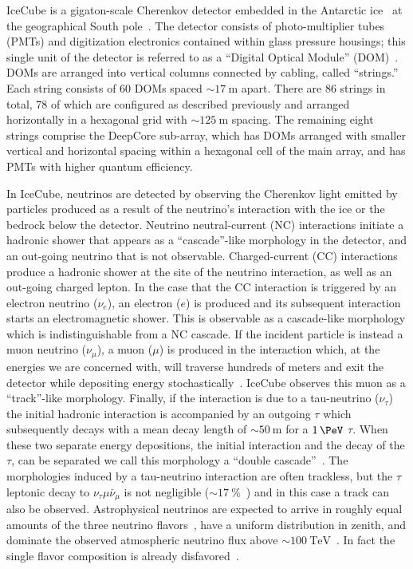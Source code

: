 IceCube is a gigaton-scale Cherenkov detector embedded in the Antarctic ice~\cite{Aartsen:2013rt} at the geographical South pole~\cite{Aartsen:2016nxy}.
The detector consists of photo-multiplier tubes (PMTs) and digitization electronics contained within glass pressure housings; this single unit of the detector is referred to as a ``Digital Optical Module'' (DOM)~\cite{Abbasi:2008aa}.
DOMs are arranged into vertical columns connected by cabling, called ``strings.''
Each string consists of 60 DOMs spaced $\sim\SI{17}\meter$ apart.
There are 86 strings in total, 78 of which are configured as described previously and arranged horizontally in a hexagonal grid with $\sim\SI{125}\meter$ spacing.
The remaining eight strings comprise the DeepCore sub-array, which has DOMs arranged with smaller vertical and horizontal spacing within a hexagonal cell of the main array, and has PMTs with higher quantum efficiency.%

In IceCube, neutrinos are detected by observing the Cherenkov light emitted by particles produced as a result of the neutrino's interaction with the ice or the bedrock below the detector.
Neutrino neutral-current (NC) interactions initiate a hadronic shower that appears as a ``cascade''-like morphology in the detector, and an out-going neutrino that is not observable.
Charged-current (CC) interactions produce a hadronic shower at the site of the neutrino interaction, as well as an out-going charged lepton.
In the case that the CC interaction is triggered by an electron neutrino ($\nu_e$), an electron ($e$) is produced and its subsequent interaction starts an electromagnetic shower.
This is observable as a cascade-like morphology which is indistinguishable from a NC cascade.
If the incident particle is instead a muon neutrino ($\nu_\mu$), a muon ($\mu$) is produced in the interaction which, at the energies we are concerned with, will traverse hundreds of meters and exit the detector while depositing energy stochastically~\cite{PhysRevD.98.030001}.
IceCube observes this muon as a ``track''-like morphology.
Finally, if the interaction is due to a tau-neutrino ($\nu_\tau$) the initial hadronic interaction is accompanied by an outgoing $\tau$ which subsequently decays with a mean decay length of $\sim \SI{50}\m$ for a $\SI{1}\PeV$ $\tau$.
When these two separate energy depositions, the initial interaction and the decay of the $\tau$, can be separated we call this morphology a ``double cascade''~\cite{Learned:1994wg,Cowen:2007ny}.
The morphologies induced by a tau-neutrino interaction are often trackless, but the $\tau$ leptonic decay to $\nu_\tau \mu \bar\nu_\mu$ is not negligible ($\sim \SI{17}\percent$~\cite{PDG2016}) and in this case a track can also be observed.
Astrophysical neutrinos are expected to arrive in roughly equal amounts of the three neutrino flavors~\cite{Farzan:2002ct,Palladino:2015vna,Arguelles:2015dca,Bustamante:2015waa,Ahlers:2018yom,Arguelles:2019tum}, have a uniform distribution in zenith, and dominate the observed atmospheric neutrino flux above $\sim\SI{100}\TeV$~\cite{Aartsen:2016xlq}.
In fact the single flavor composition is already disfavored~\cite{Aartsen:2015ivb,Aartsen:2015knd,Palladino:2015zua,Mena:2014sja,Palomares-Ruiz:2015mka}.

